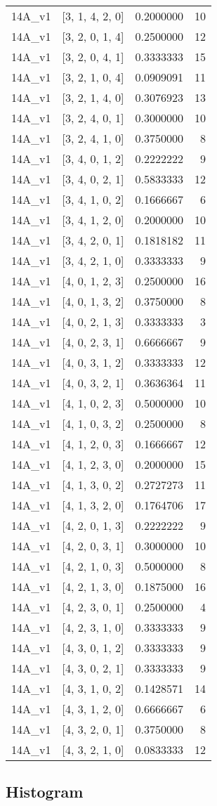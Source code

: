 \documentclass[]{book}
\theoremstyle{definition}
\theoremstyle{definition}
\theoremstyle{definition}
\theoremstyle{remark}
\begin{document}
\begin{longtable}[]{@{}llrr@{}}
14A\_v1 & {[}3, 1, 4, 2, 0{]} & 0.2000000 & 10\tabularnewline
14A\_v1 & {[}3, 2, 0, 1, 4{]} & 0.2500000 & 12\tabularnewline
14A\_v1 & {[}3, 2, 0, 4, 1{]} & 0.3333333 & 15\tabularnewline
14A\_v1 & {[}3, 2, 1, 0, 4{]} & 0.0909091 & 11\tabularnewline
14A\_v1 & {[}3, 2, 1, 4, 0{]} & 0.3076923 & 13\tabularnewline
14A\_v1 & {[}3, 2, 4, 0, 1{]} & 0.3000000 & 10\tabularnewline
14A\_v1 & {[}3, 2, 4, 1, 0{]} & 0.3750000 & 8\tabularnewline
14A\_v1 & {[}3, 4, 0, 1, 2{]} & 0.2222222 & 9\tabularnewline
14A\_v1 & {[}3, 4, 0, 2, 1{]} & 0.5833333 & 12\tabularnewline
14A\_v1 & {[}3, 4, 1, 0, 2{]} & 0.1666667 & 6\tabularnewline
14A\_v1 & {[}3, 4, 1, 2, 0{]} & 0.2000000 & 10\tabularnewline
14A\_v1 & {[}3, 4, 2, 0, 1{]} & 0.1818182 & 11\tabularnewline
14A\_v1 & {[}3, 4, 2, 1, 0{]} & 0.3333333 & 9\tabularnewline
14A\_v1 & {[}4, 0, 1, 2, 3{]} & 0.2500000 & 16\tabularnewline
14A\_v1 & {[}4, 0, 1, 3, 2{]} & 0.3750000 & 8\tabularnewline
14A\_v1 & {[}4, 0, 2, 1, 3{]} & 0.3333333 & 3\tabularnewline
14A\_v1 & {[}4, 0, 2, 3, 1{]} & 0.6666667 & 9\tabularnewline
14A\_v1 & {[}4, 0, 3, 1, 2{]} & 0.3333333 & 12\tabularnewline
14A\_v1 & {[}4, 0, 3, 2, 1{]} & 0.3636364 & 11\tabularnewline
14A\_v1 & {[}4, 1, 0, 2, 3{]} & 0.5000000 & 10\tabularnewline
14A\_v1 & {[}4, 1, 0, 3, 2{]} & 0.2500000 & 8\tabularnewline
14A\_v1 & {[}4, 1, 2, 0, 3{]} & 0.1666667 & 12\tabularnewline
14A\_v1 & {[}4, 1, 2, 3, 0{]} & 0.2000000 & 15\tabularnewline
14A\_v1 & {[}4, 1, 3, 0, 2{]} & 0.2727273 & 11\tabularnewline
14A\_v1 & {[}4, 1, 3, 2, 0{]} & 0.1764706 & 17\tabularnewline
14A\_v1 & {[}4, 2, 0, 1, 3{]} & 0.2222222 & 9\tabularnewline
14A\_v1 & {[}4, 2, 0, 3, 1{]} & 0.3000000 & 10\tabularnewline
14A\_v1 & {[}4, 2, 1, 0, 3{]} & 0.5000000 & 8\tabularnewline
14A\_v1 & {[}4, 2, 1, 3, 0{]} & 0.1875000 & 16\tabularnewline
14A\_v1 & {[}4, 2, 3, 0, 1{]} & 0.2500000 & 4\tabularnewline
14A\_v1 & {[}4, 2, 3, 1, 0{]} & 0.3333333 & 9\tabularnewline
14A\_v1 & {[}4, 3, 0, 1, 2{]} & 0.3333333 & 9\tabularnewline
14A\_v1 & {[}4, 3, 0, 2, 1{]} & 0.3333333 & 9\tabularnewline
14A\_v1 & {[}4, 3, 1, 0, 2{]} & 0.1428571 & 14\tabularnewline
14A\_v1 & {[}4, 3, 1, 2, 0{]} & 0.6666667 & 6\tabularnewline
14A\_v1 & {[}4, 3, 2, 0, 1{]} & 0.3750000 & 8\tabularnewline
14A\_v1 & {[}4, 3, 2, 1, 0{]} & 0.0833333 & 12\tabularnewline
\bottomrule
\end{longtable}

\subsection{Histogram}\label{histogram-3}
\end{document}
